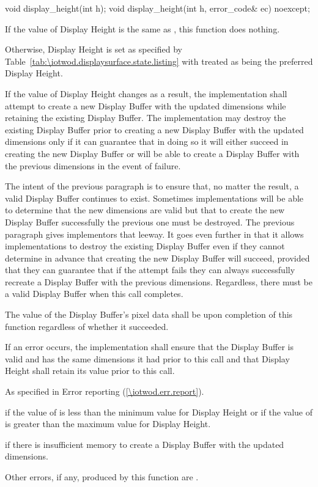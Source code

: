 \begin{itemdecl}
void display_height(int h);
void display_height(int h, error_code& ec) noexcept;
\end{itemdecl}
\begin{itemdescr}
\pnum
\effects
If the value of Display Height is the same as , this function does nothing.

\pnum
Otherwise, Display Height is set as specified by Table~\ref{tab:\iotwod.displaysurface.state.listing} with  treated as being the preferred Display Height.

\pnum
If the value of Display Height changes as a result, the implementation shall attempt to create a new Display Buffer with the updated dimensions while retaining the existing Display Buffer. The implementation may destroy the existing Display Buffer prior to creating a new Display Buffer with the updated dimensions only if it can guarantee that in doing so it will either succeed in creating the new Display Buffer or will be able to create a Display Buffer with the previous dimensions in the event of failure.

\pnum
\begin{note}
The intent of the previous paragraph is to ensure that, no matter the result, a valid Display Buffer continues to exist. Sometimes implementations will be able to determine that the new dimensions are valid but that to create the new Display Buffer successfully the previous one must be destroyed. The previous paragraph gives implementors that leeway. It goes even further in that it allows implementations to destroy the existing Display Buffer even if they cannot determine in advance that creating the new Display Buffer will succeed, provided that they can guarantee that if the attempt fails they can always successfully recreate a Display Buffer with the previous dimensions. Regardless, there must be a valid Display Buffer when this call completes.
\end{note}

\pnum
The value of the Display Buffer's pixel data shall be \unspecnorm upon completion of this function regardless of whether it succeeded.

\pnum
If an error occurs, the implementation shall ensure that the Display Buffer is valid and has the same dimensions it had prior to this call and that Display Height shall retain its value prior to this call.

\pnum
\throws
As specified in Error reporting (\ref{\iotwod.err.report}).

\pnum
\errors
{} if the value of  is less than the minimum value for Display Height or if the value of  is greater than the maximum value for Display Height.

 if there is insufficient memory to create a Display Buffer with the updated dimensions.

Other errors, if any, produced by this function are .
\end{itemdescr}

